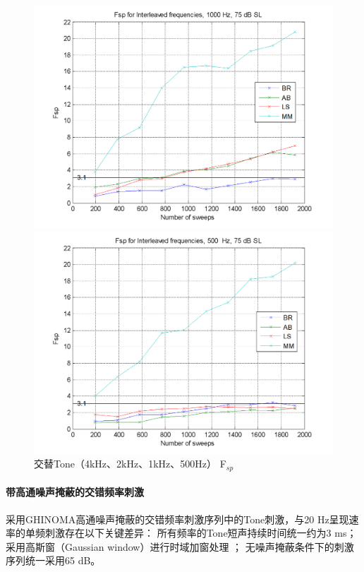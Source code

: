 \begin{figure}[H]
    \vspace{0.2cm}
    
    \begin{minipage}{0.48\textwidth}
        \includegraphics[width=\textwidth]{images/fspForInterleaved1000.png}
    \end{minipage}
    \hfill
    \begin{minipage}{0.48\textwidth}
        \includegraphics[width=\textwidth]{images/fspForInterleaved500.png}
    \end{minipage}
    \caption{交替Tone（4kHz、2kHz、1kHz、500Hz） F$_{sp}$ }
    \label{fig:Interleaved75dbGHINOMA}
\end{figure}

\paragraph*{带高通噪声掩蔽的交错频率刺激}
采用GHINOMA高通噪声掩蔽的交错频率刺激序列中的Tone刺激，与20 Hz呈现速率的单频刺激存在以下关键差异：
所有频率的Tone短声持续时间统一约为3 ms；采用高斯窗（Gaussian window）进行时域加窗处理
；
无噪声掩蔽条件下的刺激序列统一采用65 dB。


